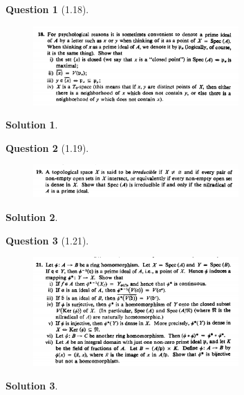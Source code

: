 \documentclass[11pt]{article}
\theoremstyle{plain}
\theoremstyle{quest}
\newtheorem*{question}{Question}
\newtheorem*{solution}{Solution}
\begin{document}
\begin{question}[1.18]
\hfill
\begin{figure}[h!]
  \centering
    \includegraphics[width=0.7\textwidth]{d-1-18.png}
\end{figure}
\end{question}
\begin{solution} \hfill \\

\end{solution}

\bigskip

\begin{question}[1.19]
\hfill
\begin{figure}[h!]
  \centering
    \includegraphics[width=0.7\textwidth]{d-1-19.png}
\end{figure}
\end{question}
\begin{solution} \hfill \\

\end{solution}

\bigskip

\begin{question}[1.21]
\hfill
\begin{figure}[h!]
  \centering
    \includegraphics[width=0.7\textwidth]{d-1-21.png}
\end{figure}
\end{question}
\begin{solution} \hfill \\

\end{solution}
\end{document}
